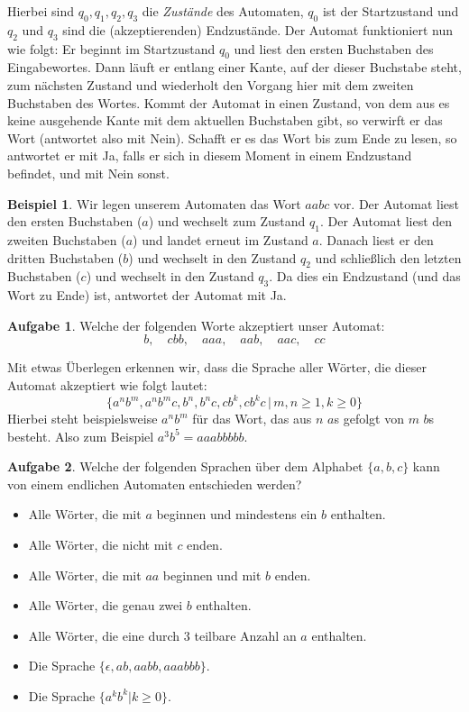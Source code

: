 \documentclass[a4paper,ngerman,12pt]{scrartcl}
\theoremstyle{definition}
\newtheorem{bsp}[defn]{Beispiel}
\newtheorem{aufg}{Aufgabe}
\theoremstyle{plain}
\theoremstyle{remark}
\begin{document}
Hierbei sind $q_0, q_1, q_2, q_3$ die \emph{Zustände} des Automaten, $q_0$ ist der Startzustand und $q_2$ und $q_3$ sind die (akzeptierenden) Endzustände. Der Automat funktioniert nun wie folgt: Er beginnt im Startzustand $q_0$ und liest den ersten Buchstaben des Eingabewortes. Dann läuft er entlang einer Kante, auf der dieser Buchstabe steht, zum nächsten Zustand und wiederholt den Vorgang hier mit dem zweiten Buchstaben des Wortes. Kommt der Automat in einen Zustand, von dem aus es keine ausgehende Kante mit dem aktuellen Buchstaben gibt, so verwirft er das Wort (antwortet also mit Nein). Schafft er es das Wort bis zum Ende zu lesen, so antwortet er mit Ja, falls er sich in diesem Moment in einem Endzustand befindet, und mit Nein sonst.

\begin{bsp}
	Wir legen unserem Automaten das Wort $aabc$ vor. Der Automat liest den ersten Buchstaben ($a$) und wechselt zum Zustand $q_1$. Der Automat liest den zweiten Buchstaben ($a$) und landet erneut im Zustand $a$. Danach liest er den dritten Buchstaben ($b$) und wechselt in den Zustand $q_2$ und schließlich den letzten Buchstaben ($c$) und wechselt in den Zustand $q_3$. Da dies ein Endzustand (und das Wort zu Ende) ist, antwortet der Automat mit Ja.
\end{bsp}

\begin{aufg}
	Welche der folgenden Worte akzeptiert unser Automat:
		\[b,\quad cbb,\quad aaa,\quad aab,\quad aac,\quad cc\]
\end{aufg}

Mit etwas Überlegen erkennen wir, dass die Sprache aller Wörter, die dieser Automat akzeptiert wie folgt lautet:
	\[\{a^nb^m, a^nb^mc, b^n, b^nc, cb^k, cb^kc \,|\, m,n \geq 1, k \geq 0\}\]
Hierbei steht beispielsweise $a^nb^m$ für das Wort, das aus $n$ $a$s gefolgt von $m$ $b$s besteht. Also zum Beispiel $a^3b^5 = aaabbbbb$.

\begin{aufg}
	Welche der folgenden Sprachen über dem Alphabet $\{a,b,c\}$ kann von einem endlichen Automaten entschieden werden?
	\begin{itemize}
		\item Alle Wörter, die mit $a$ beginnen und mindestens ein $b$ enthalten.
		\item Alle Wörter, die nicht mit $c$ enden.
		\item Alle Wörter, die mit $aa$ beginnen und mit $b$ enden.
		\item Alle Wörter, die genau zwei $b$ enthalten.
		\item Alle Wörter, die eine durch $3$ teilbare Anzahl an $a$ enthalten.
		\item Die Sprache $\{\epsilon,ab,aabb,aaabbb\}$.
		\item Die Sprache $\{a^kb^k | k \geq 0\}$.
	\end{itemize}
\end{aufg}
\end{document}
